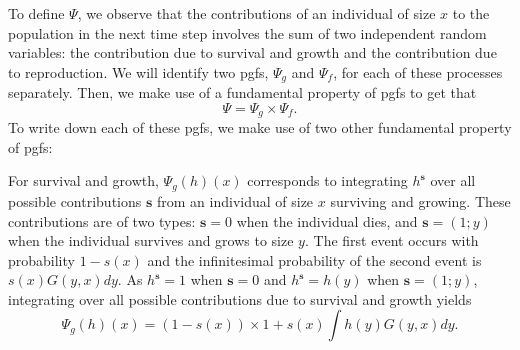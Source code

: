 \documentclass[12pt]{amsart}\usepackage[]{graphicx}\usepackage[]{color}
\def\s{\mathbf s}
\begin{document}
To define $\Psi$, we observe that the contributions of an individual of size $x$ to the population in the next time step involves the sum of two independent random variables:  the contribution due to survival and growth and the contribution due to reproduction. We will identify two pgfs, $\Psi_g$ and $\Psi_f$, for each of these processes separately. Then, we make use of a fundamental property of pgfs\vskip 0.1in
\vskip 0.1in\noindent
to get that
\[
\Psi=\Psi_g \times \Psi_f.
\]
To write down each of these pgfs, we make use of two other fundamental property of pgfs:
\vskip 0.1in
\vskip 0.1in
\vskip 0.1in

For survival and growth, $\Psi_g(h)(x)$ corresponds to integrating $h^\s$ over all possible contributions $\s$ from an individual of size $x$ surviving and growing. These contributions are of two types: $\s=0$ when the individual dies,  and $\s=(1;y)$ when the individual survives and grows to size $y$. The first event occurs with probability $1-s(x)$ and the infinitesimal probability of the second event is $s(x)G(y, x)dy$. As $h^\s=1$ when $\s=0$ and $h^\s=h(y)$ when $\s=(1;y)$, integrating over all possible contributions due to survival and growth yields
\[
\Psi_{g}(h)(x)=(1-s(x))\times 1 + s(x)\int h(y)G(y, x)dy.
\]
\end{document}
